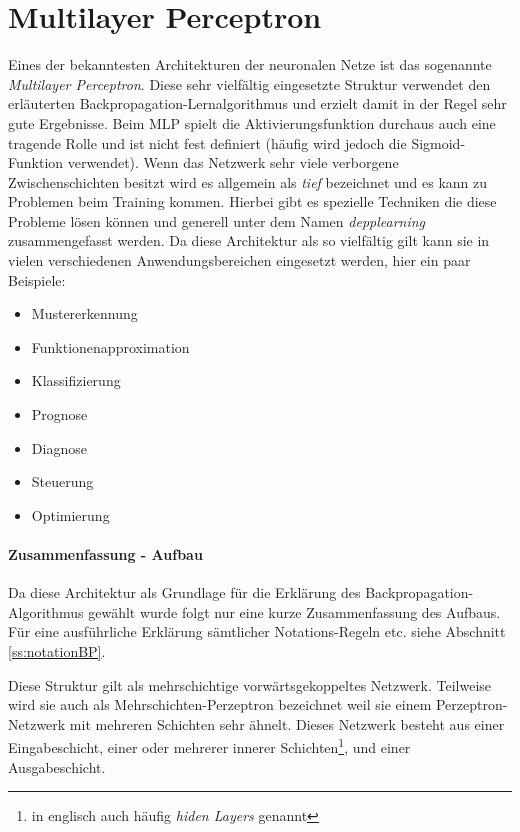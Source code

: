 \section{Multilayer Perceptron}

Eines der bekanntesten Architekturen der neuronalen Netze ist das sogenannte \emph{Multilayer Perceptron}. Diese sehr vielfältig eingesetzte Struktur verwendet den erläuterten Backpropagation-Lernalgorithmus und erzielt damit in der Regel sehr gute Ergebnisse. Beim MLP spielt die Aktivierungsfunktion durchaus auch eine tragende Rolle und ist nicht fest definiert (häufig wird jedoch die Sigmoid-Funktion verwendet). Wenn das Netzwerk sehr viele verborgene Zwischenschichten besitzt wird es allgemein als \emph{tief} bezeichnet und es kann zu Problemen beim Training kommen. Hierbei gibt es spezielle Techniken die diese Probleme lösen können und generell unter dem Namen \emph{depplearning} zusammengefasst werden. Da diese Architektur als so vielfältig gilt kann sie in vielen verschiedenen Anwendungsbereichen eingesetzt werden, hier ein paar Beispiele: 

\begin{multicols}{2}
\begin{itemize}
\item Mustererkennung 
\item Funktionenapproximation
\item Klassifizierung
\item Prognose
\item Diagnose
\item Steuerung 
\item Optimierung
\end{itemize}
\end{multicols}

\paragraph{Zusammenfassung - Aufbau}

Da diese Architektur als Grundlage für die Erklärung des Backpropagation-Algorithmus gewählt wurde folgt nur eine kurze Zusammenfassung des Aufbaus. Für eine ausführliche Erklärung sämtlicher Notations-Regeln etc. siehe Abschnitt \ref{ss:notationBP}. 

Diese Struktur gilt als mehrschichtige vorwärtsgekoppeltes Netzwerk. Teilweise wird sie auch als Mehrschichten-Perzeptron bezeichnet weil sie einem Perzeptron-Netzwerk mit mehreren Schichten sehr ähnelt. Dieses Netzwerk besteht aus einer Eingabeschicht, einer oder mehrerer innerer Schichten\footnote{in englisch auch häufig \emph{hiden Layers} genannt}, und einer Ausgabeschicht. 

